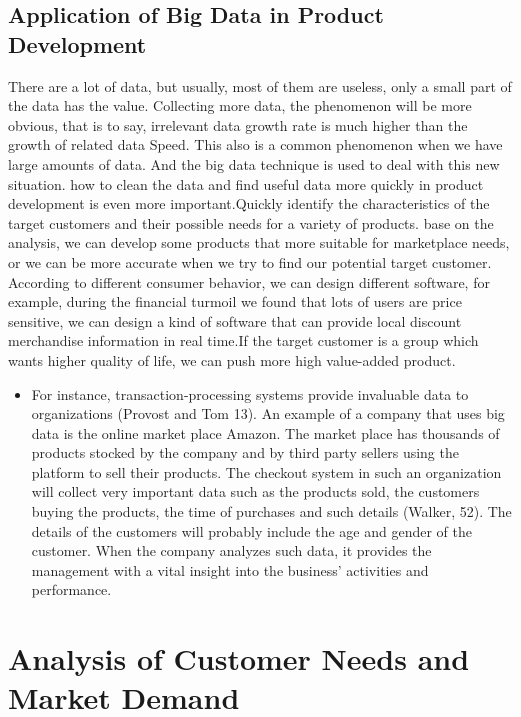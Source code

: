 \documentclass[sigconf]{acmart}
\begin{document}
\subsection{Application of Big Data in Product Development}
There are a lot of data, but usually, most of them are useless, only a small part of the data has the value. Collecting more data, the phenomenon will be more obvious, that is to say, irrelevant data growth rate is much higher than the growth of related data Speed. This also is a common phenomenon when we have large amounts of data. And the big data technique is used to deal with this new situation.
how to clean the data and find useful data more quickly in product development is even more important.Quickly identify the characteristics of the target customers and their possible needs for a variety of products. base on the analysis, we can develop some products that more suitable for marketplace needs, or we can be more accurate when we try to find our potential target customer. According to different consumer behavior, we can design different software, for example, during the financial turmoil we found that lots of users are price sensitive, we can design a kind of software that can provide local discount merchandise information in real time.If the target customer is a group which wants higher quality of life, we can push more high value-added product.
\begin{itemize}

  \item For instance, transaction-processing systems provide invaluable data to organizations (Provost and Tom 13). An example of a company that uses big data is the online market place Amazon. The market place has thousands of products stocked by the company and by third party sellers using the platform to sell their products. The checkout system in such an organization will collect very important data such as the products sold, the customers buying the products, the time of purchases and such details (Walker, 52). The details of the customers will probably include the age and gender of the customer. When the company analyzes such data, it provides the management with a vital insight into the business’ activities and performance.
\end{itemize}
\section{Analysis of Customer Needs and Market Demand}
\end{document}
